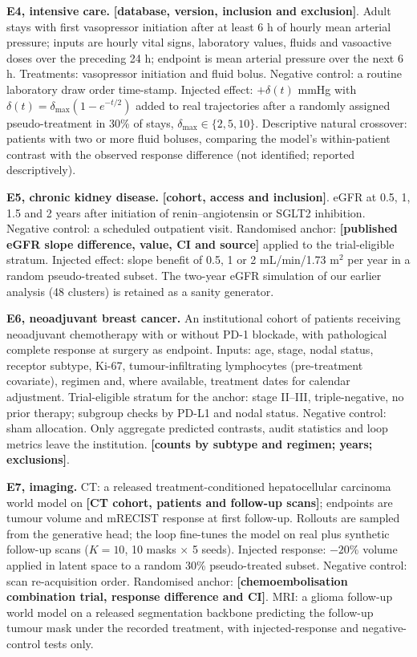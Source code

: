\documentclass[11pt,a4paper]{article}
\newcommand{\tbd}[1]{{\color{red}\textbf{[#1]}}}
\begin{document}
\textbf{E4, intensive care.} \tbd{database, version, inclusion and exclusion}. Adult stays with first vasopressor initiation after at least 6 h of hourly mean arterial pressure; inputs are hourly vital signs, laboratory values, fluids and vasoactive doses over the preceding 24 h; endpoint is mean arterial pressure over the next 6 h. Treatments: vasopressor initiation and fluid bolus. Negative control: a routine laboratory draw order time-stamp. Injected effect: $+\delta(t)$ mmHg with $\delta(t)=\delta_{\max}(1-e^{-t/2})$ added to real trajectories after a randomly assigned pseudo-treatment in 30\% of stays, $\delta_{\max}\in\{2,5,10\}$. Descriptive natural crossover: patients with two or more fluid boluses, comparing the model's within-patient contrast with the observed response difference (not identified; reported descriptively).

\textbf{E5, chronic kidney disease.} \tbd{cohort, access and inclusion}. eGFR at 0.5, 1, 1.5 and 2 years after initiation of renin--angiotensin or SGLT2 inhibition. Negative control: a scheduled outpatient visit. Randomised anchor: \tbd{published eGFR slope difference, value, CI and source} applied to the trial-eligible stratum. Injected effect: slope benefit of 0.5, 1 or 2 mL/min/1.73 m$^2$ per year in a random pseudo-treated subset. The two-year eGFR simulation of our earlier analysis (48 clusters) is retained as a sanity generator.

\textbf{E6, neoadjuvant breast cancer.} An institutional cohort of patients receiving neoadjuvant chemotherapy with or without PD-1 blockade, with pathological complete response at surgery as endpoint. Inputs: age, stage, nodal status, receptor subtype, Ki-67, tumour-infiltrating lymphocytes (pre-treatment covariate), regimen and, where available, treatment dates for calendar adjustment. Trial-eligible stratum for the anchor: stage II--III, triple-negative, no prior therapy\cite{keynote522}; subgroup checks by PD-L1 and nodal status. Negative control: sham allocation. Only aggregate predicted contrasts, audit statistics and loop metrics leave the institution. \tbd{counts by subtype and regimen; years; exclusions}.

\textbf{E7, imaging.} CT: a released treatment-conditioned hepatocellular carcinoma world model\cite{yang2025mewm} on \tbd{CT cohort, patients and follow-up scans}; endpoints are tumour volume and mRECIST response at first follow-up. Rollouts are sampled from the generative head; the loop fine-tunes the model on real plus synthetic follow-up scans ($K=10$, 10 masks $\times$ 5 seeds). Injected response: $-20\%$ volume applied in latent space to a random 30\% pseudo-treated subset. Negative control: scan re-acquisition order. Randomised anchor: \tbd{chemoembolisation combination trial, response difference and CI}. MRI: a glioma follow-up world model on a released segmentation backbone\cite{brainiac2026} predicting the follow-up tumour mask under the recorded treatment, with injected-response and negative-control tests only.
\end{document}
